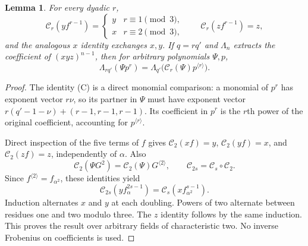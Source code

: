 \documentclass[11pt,a4paper,reqno]{amsart}
\numberwithin{equation}{section}
\theoremstyle{plain}
\newtheorem{lemma}[theorem]{Lemma}
\theoremstyle{definition}
\theoremstyle{remark}
\begin{document}
\begin{lemma}
For every dyadic $r$,
\[
\mathcal C_r(yf^{r-1})=\begin{cases}y&r\equiv1\pmod3,\\x&r\equiv2\pmod3,\end{cases}
\qquad \mathcal C_r(zf^{r-1})=z,
\]
and the analogous $x$ identity exchanges $x,y$. If $q=rq'$ and $\Lambda_n$ extracts
the coefficient of $(xyz)^{n-1}$, then for arbitrary polynomials $\Psi,p$,
\[
\Lambda_{rq'}(\Psi p^r)=\Lambda_{q'}\bigl(\mathcal C_r(\Psi)p^{\langle r\rangle}\bigr).
\tag{C}
\]
\end{lemma}
\begin{proof}
The identity (C) is a direct monomial comparison: a monomial of $p^r$ has exponent
vector $r\nu$, so its partner in $\Psi$ must have exponent vector
$r(q'-1-\nu)+(r-1,r-1,r-1)$. Its coefficient in $p^r$ is the $r$th power of the
original coefficient, accounting for $p^{\langle r\rangle}$.

Direct inspection of the five terms of $f$ gives $\mathcal C_2(xf)=y$, $\mathcal
C_2(yf)=x$, and $\mathcal C_2(zf)=z$, independently of $\alpha$. Also
\[
\mathcal C_2(\Psi G^2)=\mathcal C_2(\Psi)G^{\langle2\rangle},\qquad \mathcal C_{2s}=\mathcal C_s\circ \mathcal C_2.
\]
Since $f^{\langle2\rangle}=f_{\alpha^2}$, these identities yield
\[
\mathcal C_{2s}(yf_\alpha^{2s-1})=\mathcal C_s(xf_{\alpha^2}^{s-1}).
\]
Induction alternates $x$ and $y$ at each doubling. Powers of two alternate between
residues one and two modulo three. The $z$ identity follows by the same induction.
This proves the result over arbitrary fields of characteristic two. No inverse
Frobenius on coefficients is used.
\end{proof}
\end{document}
